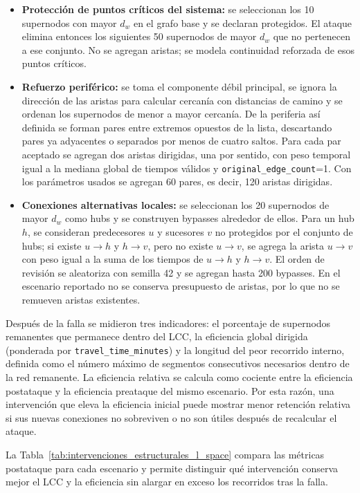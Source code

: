             \begin{itemize}
                \item \textbf{Protección de puntos críticos del sistema:} se seleccionan los 10 supernodos con mayor \(d_w\) en el grafo base y se declaran protegidos. El ataque elimina entonces los siguientes 50 supernodos de mayor \(d_w\) que no pertenecen a ese conjunto. No se agregan aristas; se modela continuidad reforzada de esos puntos críticos.
                \item \textbf{Refuerzo periférico:} se toma el componente débil principal, se ignora la dirección de las aristas para calcular cercanía con distancias de camino y se ordenan los supernodos de menor a mayor cercanía. De la periferia así definida se forman pares entre extremos opuestos de la lista, descartando pares ya adyacentes o separados por menos de cuatro saltos. Para cada par aceptado se agregan dos aristas dirigidas, una por sentido, con peso temporal igual a la mediana global de tiempos válidos y \texttt{original\_edge\_count}=1. Con los parámetros usados se agregan 60 pares, es decir, 120 aristas dirigidas.
                \item \textbf{Conexiones alternativas locales:} se seleccionan los 20 supernodos de mayor \(d_w\) como hubs y se construyen bypasses alrededor de ellos. Para un hub \(h\), se consideran predecesores \(u\) y sucesores \(v\) no protegidos por el conjunto de hubs; si existe \(u\to h\) y \(h\to v\), pero no existe \(u\to v\), se agrega la arista \(u\to v\) con peso igual a la suma de los tiempos de \(u\to h\) y \(h\to v\). El orden de revisión se aleatoriza con semilla 42 y se agregan hasta 200 bypasses. En el escenario reportado no se conserva presupuesto de aristas, por lo que no se remueven aristas existentes.
            \end{itemize}
            Después de la falla se midieron tres indicadores: el porcentaje de supernodos remanentes que permanece dentro del LCC, la eficiencia global dirigida (ponderada por \texttt{travel\_time\_minutes}) y la longitud del peor recorrido interno, definida como el número máximo de segmentos consecutivos necesarios dentro de la red remanente. La eficiencia relativa se calcula como cociente entre la eficiencia postataque y la eficiencia preataque del mismo escenario. Por esta razón, una intervención que eleva la eficiencia inicial puede mostrar menor retención relativa si sus nuevas conexiones no sobreviven o no son útiles después de recalcular el ataque.

            La Tabla~\ref{tab:intervenciones_estructurales_l_space} compara las métricas postataque para cada escenario y permite distinguir qué intervención conserva mejor el LCC y la eficiencia sin alargar en exceso los recorridos tras la falla.

